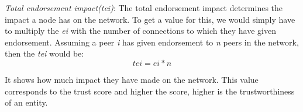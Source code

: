 \textit{Total endorsement impact(tei)}: The total endorsement impact determines the 
impact a node has on the network. To get a value for this, we would simply have to 
multiply the \textit{ei} with the number of connections to which they have given
endorsement. Assuming a peer \textit{i} has given endorsement to \textit{n} 
peers in the network, then the \textit{tei} would be: 
\begin{equation}
	tei = ei * n 
\end{equation}

It shows how much impact they have made on the network. This value corresponds to 
the trust score and higher the score, higher is the trustworthiness of an entity.

 
 
 
 
 
 
 
 
 
 











% 


